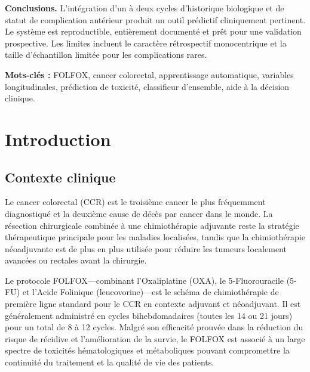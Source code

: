 \documentclass[12pt,a4paper]{report}
\begin{document}
\vspace{0.5em}
\noindent\textbf{Conclusions.}
L'intégration d'un à deux cycles d'historique biologique et de statut de complication antérieur produit un outil prédictif cliniquement pertinent. Le système est reproductible, entièrement documenté et prêt pour une validation prospective. Les limites incluent le caractère rétrospectif monocentrique et la taille d'échantillon limitée pour les complications rares.

\vspace{1em}
\noindent\textbf{Mots-clés :} FOLFOX, cancer colorectal, apprentissage automatique, variables longitudinales, prédiction de toxicité, classifieur d'ensemble, aide à la décision clinique.

\tableofcontents
\listoffigures
\listoftables

\chapter{Introduction}

\section{Contexte clinique}

Le cancer colorectal (CCR) est le troisième cancer le plus fréquemment diagnostiqué et la deuxième cause de décès par cancer dans le monde. La résection chirurgicale combinée à une chimiothérapie adjuvante reste la stratégie thérapeutique principale pour les maladies localisées, tandis que la chimiothérapie néoadjuvante est de plus en plus utilisée pour réduire les tumeurs localement avancées ou rectales avant la chirurgie.

Le protocole FOLFOX---combinant l'Oxaliplatine (OXA), le 5-Fluorouracile (5-FU) et l'Acide Folinique (leucovorine)---est le schéma de chimiothérapie de première ligne standard pour le CCR en contexte adjuvant et néoadjuvant. Il est généralement administré en cycles bihebdomadaires (toutes les 14 ou 21 jours) pour un total de 8 à 12 cycles. Malgré son efficacité prouvée dans la réduction du risque de récidive et l'amélioration de la survie, le FOLFOX est associé à un large spectre de toxicités hématologiques et métaboliques pouvant compromettre la continuité du traitement et la qualité de vie des patients.
\end{document}
